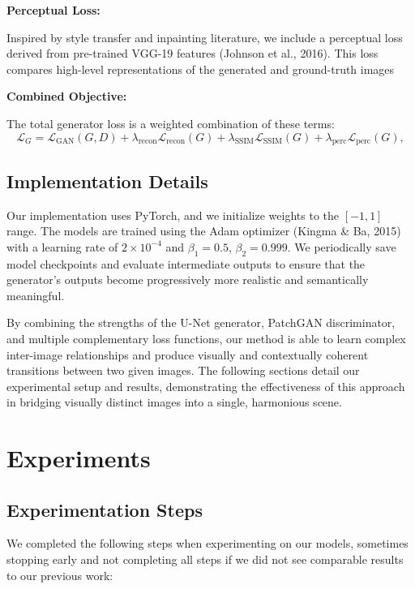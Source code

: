 \documentclass[sigconf]{acmart}
\begin{document}
\textbf{Perceptual Loss:}

Inspired by style transfer and inpainting literature, we include a perceptual loss derived from pre-trained VGG-19 features (Johnson et al., 2016). This loss compares high-level representations of the generated and ground-truth images

\textbf{Combined Objective:}

The total generator loss is a weighted combination of these terms:
\[
\mathcal{L}_{G} = \mathcal{L}_{\text{GAN}}(G,D) + \lambda_{\text{recon}}\mathcal{L}_{\text{recon}}(G) + \lambda_{\text{SSIM}}\mathcal{L}_{\text{SSIM}}(G) + \lambda_{\text{perc}}\mathcal{L}_{\text{perc}}(G),
\]


\subsection*{Implementation Details}

Our implementation uses PyTorch, and we initialize weights to the $[-1, 1]$ range. The models are trained using the Adam optimizer (Kingma \& Ba, 2015) with a learning rate of $2 \times 10^{-4}$ and $\beta_1 = 0.5$, $\beta_2 = 0.999$. We periodically save model checkpoints and evaluate intermediate outputs to ensure that the generator’s outputs become progressively more realistic and semantically meaningful. 

By combining the strengths of the U-Net generator, PatchGAN discriminator, and multiple complementary loss functions, our method is able to learn complex inter-image relationships and produce visually and contextually coherent transitions between two given images. The following sections detail our experimental setup and results, demonstrating the effectiveness of this approach in bridging visually distinct images into a single, harmonious scene.

\section*{Experiments}

\subsection*{Experimentation Steps}

We completed the following steps when experimenting on our models, sometimes stopping early and not completing all steps if we did not see comparable results to our previous work:
\end{document}
